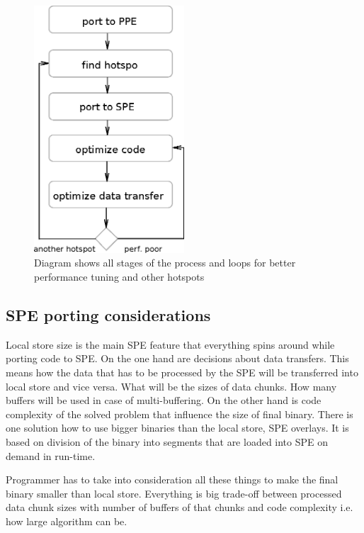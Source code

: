 \begin{figure}
    \centering
    \includegraphics[width=0.5\textwidth]{data/portingCycle}
    \caption[Application porting cycle]{Diagram shows all stages of the process and loops for better performance tuning and other hotspots}
    \label{fg:appPorting}
\end{figure}

\subsection {SPE porting considerations}

\par
Local store size is the main SPE feature that everything spins around while porting code to SPE.
On the one hand are decisions about data transfers.
This means how the data that has to be processed by the SPE will be transferred into local store and vice versa.
What will be the sizes of data chunks.
How many buffers will be used in case of multi-buffering.
On the other hand is code complexity of the solved problem that influence the size of final binary.
There is one solution how to use bigger binaries than the local store, SPE overlays.
It is based on division of the binary into segments that are loaded into SPE on demand in run-time.

\par
Programmer has to take into consideration all these things to make the final binary smaller than local store.
Everything is big trade-off between processed data chunk sizes with number of buffers of that chunks and code complexity i.e. how large algorithm can be.

